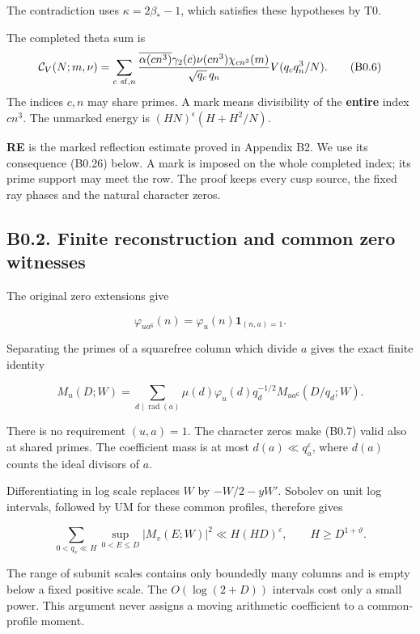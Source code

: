 \documentclass[11pt,a4paper]{article}
\begin{document}
The contradiction uses \(\kappa=2\beta_*-1\), which satisfies these
hypotheses by T0.

The completed theta sum is \[
\mathcal C_V(N;m,\nu)=\sum_{c\ {\rm sf},n}
\frac{\overline{\alpha(cn^3)}\gamma_2(c)\nu(cn^3)\chi_{cn^3}(m)}
{\sqrt{q_c}\,q_n}V(q_cq_n^3/N).
\tag{B0.6}
\] The indices \(c,\allowbreak{}n\) may share primes. A mark means divisibility of
the \textbf{entire} index \(cn^3\). The unmarked energy is
\((HN)^\epsilon(H+H^2/N)\).

\textbf{RE} is the marked reflection estimate proved in Appendix B2. We
use its consequence (B0.26) below. A mark is imposed on the whole
completed index; its prime support may meet the row. The proof keeps
every cusp source, the fixed ray phases and the natural character zeros.

\hypertarget{b0.2.-finite-reconstruction-and-common-zero-witnesses}{%
\subsection{B0.2. Finite reconstruction and common zero
witnesses}\label{b0.2.-finite-reconstruction-and-common-zero-witnesses}}

The original zero extensions give

\[
\varphi_{ua^6}(n)=\varphi_u(n)\mathbf1_{(n,a)=1}.
\]

Separating the primes of a squarefree column which divide \(a\) gives
the exact finite identity

\[
M_u(D;W)=\sum_{d\mid\operatorname{rad}(a)}
\mu(d)\varphi_u(d)q_d^{-1/2}M_{ua^6}(D/q_d;W).
\tag{B0.7}
\]

There is no requirement \((u,\allowbreak{}a)=1\). The character zeros make (B0.7)
valid also at shared primes. The coefficient mass is at most
\(d(a)\ll q_a^\varepsilon\), where \(d(a)\) counts the ideal divisors of
\(a\).

Differentiating in log scale replaces \(W\) by \(-W/2-yW'\). Sobolev on
unit log intervals, followed by UM for these common profiles, therefore
gives

\[
\sum_{0<q_v\ll H}\sup_{0<E\le D}|M_v(E;W)|^2
\ll H(HD)^\varepsilon,
\qquad H\ge D^{1+\vartheta}.
\tag{B0.8}
\]

The range of subunit scales contains only boundedly many columns and is
empty below a fixed positive scale. The \(O(\log(2+D))\) intervals cost
only a small power. This argument never assigns a moving arithmetic
coefficient to a common-profile moment.
\end{document}
